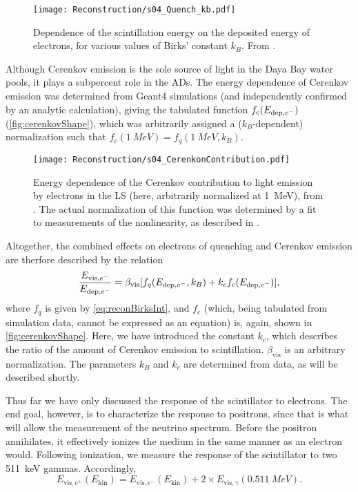 \documentclass[../thesis.tex]{subfiles}
\begin{document}
\begin{figure}[h]
  \texttt{[image: Reconstruction/s04\_Quench\_kb.pdf]}
  \caption{Dependence of the scintillation energy on the deposited energy of electrons, for various values of Birks' constant $k_B$. From \cite{NonlinearityPaper}.}
  \label{fig:reconBirksInt}
\end{figure}

Although Cerenkov emission is the sole source of light in the Daya Bay water pools, it plays a subpercent role in the ADs. The energy dependence of Cerenkov emission was determined from Geant4 simulations (and independently confirmed by an analytic calculation), giving the tabulated function $f_c(E_{\mathrm{dep},e^-})$ (\autoref{fig:cerenkovShape}), which was arbitrarily assigned a ($k_B$-dependent) normalization such that $f_c(\SI{1}{MeV}) = f_q(\SI{1}{MeV}, k_B)$. 

\begin{figure}[h]
  \texttt{[image: Reconstruction/s04\_CerenkonContribution.pdf]}
  \caption{Energy dependence of the Cerenkov contribution to light emission by electrons in the LS (here, arbitrarily normalized at 1~MeV), from \cite{NonlinearityPaper}. The actual normalization of this function was determined by a fit to measurements of the nonlinearity, as described in \cite{NonlinearityPaper}.}
  \label{fig:cerenkovShape}
\end{figure}

Altogether, the combined effects on electrons of quenching and Cerenkov emission are therfore described by the relation
\begin{equation}
  \label{eq:reconScintNonlin}
  \frac{E_{\mathrm{vis},e^-}}{E_{\mathrm{dep},e^-}} = \beta_{\mathrm{vis}}[f_q(E_{\mathrm{dep},e^-}, k_B) + k_c f_c(E_{\mathrm{dep},e^-})],
\end{equation}
where $f_q$ is given by \autoref{eq:reconBirksInt}, and $f_c$ (which, being tabulated from simulation data, cannot be expressed as an equation) is, again, shown in \autoref{fig:cerenkovShape}. Here, we have introduced the constant $k_c$, which describes the ratio of the amount of Cerenkov emission to scintillation. $\beta_{\mathrm{vis}}$ is an arbitrary normalization. The parameters $k_B$ and $k_c$ are determined from data, as will be described shortly.

Thus far we have only discussed the response of the scintillator to electrons. The end goal, however, is to characterize the response to positrons, since that is what will allow the measurement of the neutrino spectrum. Before the positron annihilates, it effectively ionizes the medium in the same manner as an electron would. Following ionization, we measure the response of the scintillator to two 511~keV gammas. Accordingly,
\begin{equation}
  \label{eq:reconScintPositron}
  E_{\mathrm{vis},e^+}(E_{\mathrm{kin}}) = E_{\mathrm{vis},e^-}(E_{\mathrm{kin}}) + 2 \times E_{\mathrm{vis},\gamma}(\SI{0.511}{MeV}).
\end{equation}
\end{document}
